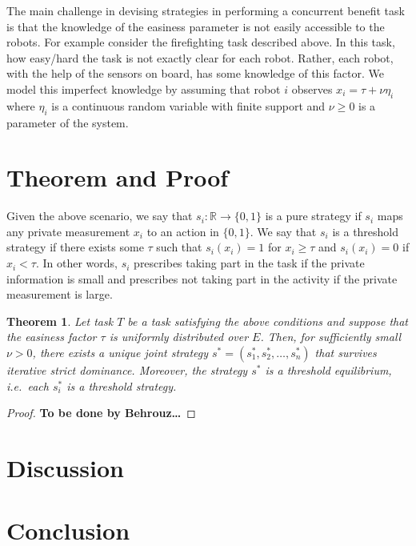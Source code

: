 \documentclass[conference]{ieeeconf}
\newtheorem{theorem}{Theorem}
\def\R{\mathbb{R}}
\begin{document}
The main challenge in devising strategies in performing a concurrent benefit task is that the knowledge of the easiness parameter is not easily accessible to the robots. For example consider the firefighting task described above. In this task, how easy/hard the task is not exactly clear for each robot. Rather, each robot, with the help of the sensors on board, has some knowledge of this factor. We model this imperfect knowledge by assuming that robot $i$ observes $x_i=\tau+\nu \eta_i$ where $\eta_i$ is a continuous random variable with finite support and $\nu\geq 0$ is a parameter of the system. 

\section{Theorem and Proof}\label{sec:thmproof}
Given the above scenario, we say that $s_i:\R\to \{0,1\}$ is a pure strategy if  $s_i$ maps any private measurement $x_i$ to an action in $\{0,1\}$. We say that $s_i$ is a threshold strategy if there exists some $\tau$ such that $s_i(x_i)=1$ for $x_i\geq \tau$ and $s_i(x_i)=0$ if $x_i<\tau$. In other words, $s_i$ prescribes taking part in the task if the private information is small and prescribes not taking part in the activity if the private measurement is large. 

\begin{theorem}
Let task $T$ be a task satisfying the above conditions and suppose that the easiness factor $\tau$ is uniformly distributed over $E$. Then, for sufficiently small $\nu>0$, there exists a unique joint strategy $s^*=(s_1^*,s_2^*,\ldots,s_n^*)$ that survives iterative strict dominance. Moreover, the strategy $s^*$ is a threshold equilibrium, i.e.\ each $s_i^*$ is a threshold strategy.
\end{theorem}

\begin{proof}
\textbf{To be done by Behrouz\ldots}
\end{proof}



\section{Discussion}\label{sec:disc}




\section{Conclusion}\label{sec:conc}




\nocite{*}

\end{document}
